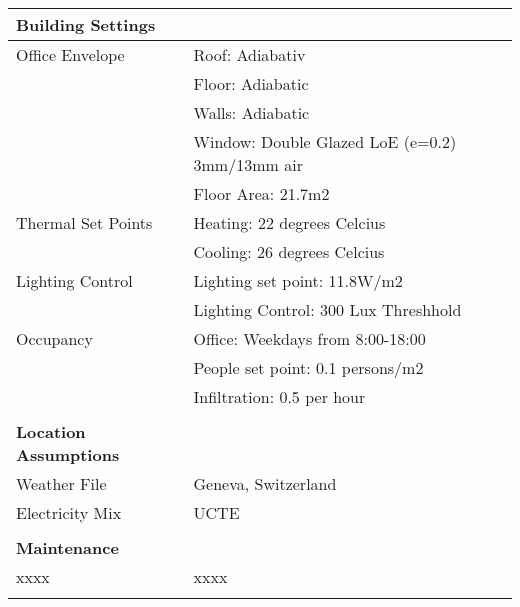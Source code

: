 \begin{table}[H]
\centering
\begin{tabular}{ll}

\textbf{Building Settings}    &                                                \\
\hline
Office Envelope               & Roof: Adiabativ                                \\
                              & Floor: Adiabatic                               \\
                              & Walls: Adiabatic                               \\
                              & Window: Double Glazed LoE (e=0.2) 3mm/13mm air \\
                              & Floor Area: 21.7m2                             \\
\hline                           
Thermal Set Points            & Heating: 22 degrees Celcius                    \\
                              & Cooling: 26 degrees Celcius                    \\
\hline
Lighting Control              & Lighting set point: 11.8W/m2                   \\
                              & Lighting Control: 300 Lux Threshhold           \\
\hline
Occupancy                     & Office: Weekdays from 8:00-18:00               \\
                              & People set point: 0.1 persons/m2               \\
                              & Infiltration: 0.5 per hour                     \\
                              &                                                \\

\textbf{Location Assumptions} &                                                \\
\hline
Weather File                  & Geneva, Switzerland                            \\
Electricity Mix               & UCTE                                           \\
                              &                                                \\

\textbf{Maintenance}          &                                                \\
\hline
xxxx                          & xxxx                                           \\
                              &                                                \\


\end{tabular}
\end{table}
